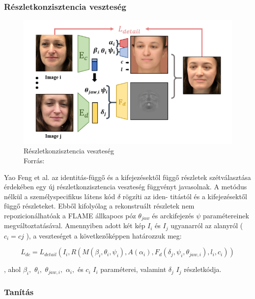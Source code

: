 \documentclass[12pt,a4]{article}
\begin{document}
 \subsubsection{Részletkonzisztencia veszteség}
	 
	 \begin{figure}[h]	
	 	\centering
	 	\includegraphics[width=1\linewidth]{ldetail}
	 	\caption{Részletkonzisztencia veszteség \\
	 		Forrás:\cite{deca}}
        \label{fig:ldetail}
	 \end{figure}
 
 	Yao Feng et al. az identitás-függő és a kifejezésektől függő részletek
 	szétválasztása érdekében egy új részletkonzisztencia veszteség függvényt
 	javasolnak. A metódus nélkül a személyspecifikus látens kód $\delta$ rögzíti az iden-
 	titástól és a kifejezésektől függő részleteket. Ebből kifolyólag a rekonstruált
 	részletek nem repozicionálhatóak a FLAME állkapocs póz $\theta_{jaw}$ és arckifejezés $\psi$
 	paramétereinek megváltoztatásával.
 	Amennyiben adott két kép $I_{i}$ és $I_{j}$ ugyanarról az alanyról ($c_{i} = c{j}$ ), a
 	veszteséget a következőképpen határozzuk meg:

    \begin{equation*}
    L_{dc} = L_{detail}(I_{i}, R(M (\beta_{i}, \theta_{i}, \psi_{i}), A(\alpha_{i}), F_{d}(\delta_{j} , \psi_{i}, \theta_{jaw,i}), l_{i}, c_{i}))
    \end{equation*}
   
 	, ahol $\beta_{i},$ $\theta_{i},$ $\theta_{jaw,i},$ $\alpha_{i},$ és $c_{i}$ $I_{i}$ paraméterei, valamint $\delta_{j}$ $I_{j}$ részletkódja.
 	
 	\subsubsection{Tanítás}
 	
\end{document}

